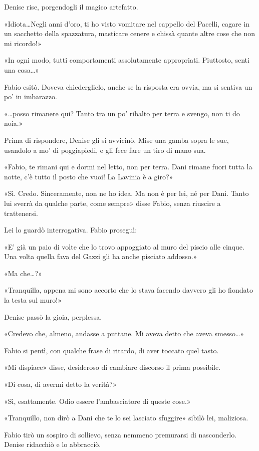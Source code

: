 Denise rise, porgendogli il magico artefatto.

«Idiota\ldots Negli anni d'oro, ti ho visto vomitare nel cappello del Pacelli, cagare in un sacchetto della spazzatura, masticare cenere e chissà quante altre cose che non mi ricordo!»

«In ogni modo, tutti comportamenti assolutamente appropriati. Piuttosto, senti una cosa\ldots»

Fabio esitò. Doveva chiederglielo, anche se la risposta era ovvia, ma si sentiva un po' in imbarazzo.

«\ldots posso rimanere qui? Tanto tra un po' ribalto per terra e svengo, non ti do noia.»

Prima di rispondere, Denise gli si avvicinò. Mise una gamba sopra le sue, usandolo a mo' di poggiapiedi, e gli fece fare un tiro di mano sua.

«Fabio, te rimani qui e dormi nel letto, non per terra. Dani rimane fuori tutta la notte, c'è tutto il posto che vuoi! La Lavinia è a giro?»

«Sì. Credo. Sinceramente, non ne ho idea. Ma non è per lei, né per Dani. Tanto lui sverrà da qualche parte, come sempre» disse Fabio, senza riuscire a trattenersi.

Lei lo guardò interrogativa. Fabio proseguì:

«E' già un paio di volte che lo trovo appoggiato al muro del piscio alle cinque. Una volta quella fava del Gazzi gli ha anche pisciato addosso.»

«Ma che\ldots?»

«Tranquilla, appena mi sono accorto che lo stava facendo davvero gli ho fiondato la testa sul muro!»

Denise passò la gioia, perplessa.

«Credevo che, almeno, andasse a puttane. Mi aveva detto che aveva smesso\ldots»

Fabio si pentì, con qualche frase di ritardo, di aver toccato quel tasto.

«Mi dispiace» disse, desideroso di cambiare discorso il prima possibile.

«Di cosa, di avermi detto la verità?»

«Sì, esattamente. Odio essere l'ambasciatore di queste cose.»

«Tranquillo, non dirò a Dani che te lo sei lasciato sfuggire» sibilò lei, maliziosa.

Fabio tirò un sospiro di sollievo, senza nemmeno premurarsi di nasconderlo. Denise ridacchiò e lo abbracciò.

